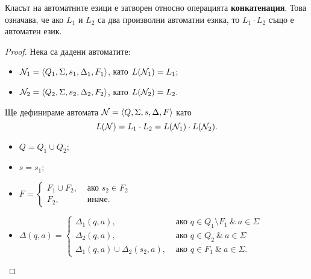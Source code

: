 \begin{lemma}
  Класът на автоматните езици е затворен относно операцията {\bf конкатенация}.
  Това означава, че ако $L_1$ и $L_2$ са два произволни автоматни езика, то $L_1\cdot L_2$
  също е автоматен език.
\end{lemma}
\begin{proof}
  Нека са дадени автоматите:
  \begin{itemize}
  \item
    $\mathcal{N}_1 = \langle{Q_1,\Sigma,s_1,\Delta_1,F_1}\rangle$, като $L(\mathcal{N}_1) = L_1$;
  \item
    $\mathcal{N}_2 = \langle{Q_2,\Sigma,s_2,\Delta_2,F_2}\rangle$, като $L(\mathcal{N}_2) = L_2$.
  \end{itemize}
  Ще дефинираме автомата $\mathcal{N} = \langle{Q,\Sigma,s,\Delta,F}\rangle$ като
  \[L(\mathcal{N}) = L_1\cdot L_2 = L(\mathcal{N}_1)\cdot L(\mathcal{N}_2).\]
  \begin{itemize}
  \item
    $Q = Q_1 \cup Q_2$;
  \item
    $s = s_1$;
  \item
    $F = 
    \begin{cases}
      F_1 \cup F_2, & \text{ ако } s_2 \in F_2\\
      F_2,          & \text{ иначе}.
    \end{cases}$
  \item 
    $\Delta(q,a) = 
    \begin{cases}
      \Delta_1(q,a),                      & \text{ ако }q\in Q_1\setminus F_1\ \&\ a\in\Sigma\\
      \Delta_2(q,a),                      & \text{ ако }q\in Q_2\ \&\ a\in\Sigma\\
      \Delta_1(q,a) \cup \Delta_2(s_2,a), & \text{ ако }q \in F_1\ \&\ a\in\Sigma.
    \end{cases}$
  \end{itemize}
\end{proof}

